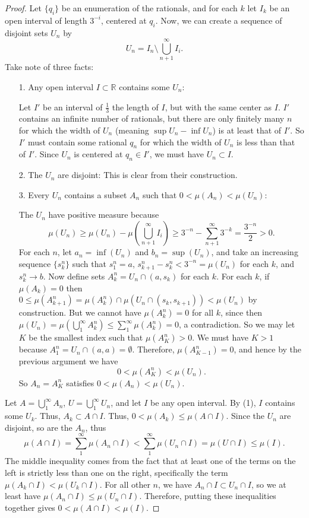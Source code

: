 \documentclass[10pt]{article}
\newcommand{\R}{\mathbb{R}}
\begin{document}
\begin{enumerate}
\begin{proof}

Let $\{q_i\}$ be an enumeration of the rationals, and for each $k$ let $I_k$ be an open interval of length $3^{-i}$, centered at $q_i$.  Now, we can create a sequence of disjoint sets $U_n$ by
$$
U_n = I_n \setminus \bigcup_{n+1}^\infty I_i.
$$
Take note of three facts:
\begin{enumerate}
\item[1.] Any open interval $I \subset \R$ contains some $U_n$:

Let $I'$ be an interval of $\frac13$ the length of $I$, but with the same center as $I$.  $I'$ contains an infinite number of rationals, but there are only finitely many $n$ for which the width of $U_n$ (meaning $\sup U_n - \inf U_n$) is at least that of $I'$.  So $I'$ must contain some rational $q_n$ for which the width of $U_n$ is less than that of $I'$.  Since $U_n$ is centered at $q_n \in I'$, we must have $U_n \subset I$.

\item[2.] The $U_n$ are disjoint:  This is clear from their construction.

\item[3.] Every $U_n$ contains a subset $A_n$ such that $0 < \mu(A_n) < \mu(U_n)$:

The $U_n$ have positive measure because
$$
\mu(U_n) \geq \mu(U_n) - \mu(\bigcup_{n+1}^\infty I_i) \geq 3^{-n} - \sum_{n+1}^\infty 3^{-k} = \frac{3^{-n}}{2} > 0.
$$
For each $n$, let $a_n = \inf(U_n)$ and $b_n = \sup(U_n)$, and take an increasing sequence $\{s_k^n\}$ such that $s_1^n = a$, $s_{k+1}^n - s_k^n < 3^{-n} = \mu(U_n)$ for each $k$, and $s_k^n \rightarrow b$.  Now define sets $A_k^n = U_n \cap (a,s_k)$ for each $k$.  For each $k$, if $\mu(A_k) = 0$ then $0 \leq \mu(A_{k+1}^n) = \mu(A_k^n) \cap \mu(U_n \cap (s_k, s_{k+1})) < \mu(U_n)$ by construction.  But we cannot have $\mu(A_k^n) = 0$ for all $k$, since then $\mu(U_n) = \mu(\bigcup_1^\infty A_k^n) \leq \sum_1^\infty \mu(A_k^n) = 0$, a contradiction.  So we may let $K$ be the smallest index such that $\mu(A_K^n) > 0$.  We must have $K > 1$ because $A_1^n = U_n \cap (a,a) = \emptyset$.  Therefore, $\mu(A_{K-1}^n) = 0$, and hence by the previous argument we have
$$
0 < \mu(A_K^n) < \mu(U_n).
$$
So $A_n = A_K^n$ satisfies $0 < \mu(A_n) < \mu(U_n)$.
\end{enumerate}

Let $A = \bigcup_1^\infty A_n$, $U = \bigcup_1^\infty U_n$, and let $I$ be any open interval.  By (1), $I$ contains some $U_k$.  Thus, $A_k \subset A \cap I$.  Thus, $0 < \mu(A_k) \leq \mu(A \cap I)$.  Since the $U_n$ are disjoint, so are the $A_n$, thus
$$
\mu(A \cap I) = \sum_1^\infty \mu(A_n \cap I) < \sum_1^\infty \mu(U_n \cap I) = \mu(U \cap I) \leq \mu(I).
$$
The middle inequality comes from the fact that at least one of the terms on the left is strictly less than one on the right, specifically the term $\mu(A_k \cap I) < \mu(U_k \cap I)$.  For all other $n$, we have $A_n \cap I \subset U_n \cap I$, so we at least have $\mu(A_n \cap I) \leq \mu(U_n \cap I)$.  Therefore, putting these inequalities together gives $0 < \mu(A \cap I) < \mu(I)$.


\end{proof}
\end{enumerate}
\end{document}
